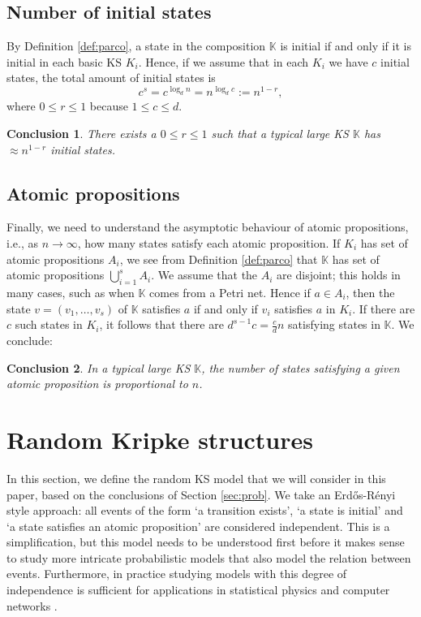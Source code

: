 \documentclass[runngingheads]{llncs}
\newtheorem{conclusion}{Conclusion}
\begin{document}
\subsection{Number of initial states}

By Definition \ref{def:parco}, a state in the composition $\mathbb{K}$ is initial if and only if it is initial in each basic KS $K_i$. Hence, if we assume that in each $K_i$ we have $c$ initial states, the total amount of initial states is
\[
c^s = c^{\log_d n} = n^{\log_d c} := n^{1-r},
\]
where $0 \leq r \leq 1$ because $1 \leq c \leq d$.

\begin{conclusion}
There exists a $0 \leq r \leq 1$ such that a typical large KS $\mathbb{K}$ has $\approx n^{1-r}$ initial states.
\end{conclusion}

\subsection{Atomic propositions} \label{ssec:ap}

Finally, we need to understand the asymptotic behaviour of atomic propositions, i.e., as $n \rightarrow \infty$, how many states satisfy each atomic proposition. If $K_i$ has set of atomic propositions $A_i$, we see from Definition \ref{def:parco} that $\mathbb{K}$ has set of atomic propositions $\bigcup_{i=1}^s A_i$. We assume that the $A_i$ are disjoint; this holds in many cases, such as when $\mathbb{K}$ comes from a Petri net. Hence if $a \in A_i$, then the state $v = (v_1,\ldots,v_s)$ of $\mathbb{K}$ satisfies $a$ if and only if $v_i$ satisfies $a$ in $K_i$. If there are $c$ such states in $K_i$, it follows that there are $d^{s-1}c = \tfrac{c}{d}n$ satisfying states in $\mathbb{K}$. We conclude:

\begin{conclusion}
In a typical large KS $\mathbb{K}$, the number of states satisfying a given atomic proposition is proportional to $n$.
\end{conclusion}



\section{Random Kripke structures} \label{sec:prelim}

In this section, we define the random KS model that we will consider in this paper, based on the conclusions of Section \ref{sec:prob}. We take an Erd\H{o}s-Rényi style approach: all events of the form `a transition exists', `a state is initial' and `a state satisfies an atomic proposition' are considered independent. This is a simplification, but this model needs to be understood first before it makes sense to study more intricate probabilistic models that also model the relation between events. Furthermore, in practice studying models with this degree of independence is sufficient for applications in statistical physics \cite{andreanov2004large} and computer networks \cite{simonian1995large}.
\end{document}
